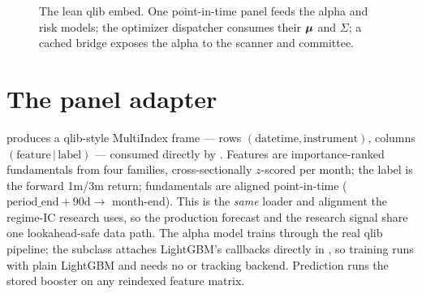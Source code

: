 \documentclass[11pt]{article}
\begin{document}
\begin{figure}[h]
\centering
{}
\caption{The lean qlib embed. One point-in-time panel feeds the alpha and risk
models; the optimizer dispatcher consumes their $\boldsymbol{\mu}$ and $\Sigma$; a cached bridge
exposes the alpha to the scanner and committee.}
\end{figure}

\section{The panel adapter}
 produces a qlib-style MultiIndex frame --- rows
$(\text{datetime},\text{instrument})$, columns
$(\text{feature}\,|\,\text{label})$ --- consumed directly by
. Features are importance-ranked fundamentals from four
families, cross-sectionally $z$-scored per month; the label is the forward 1m/3m
return; fundamentals are aligned point-in-time ($\text{period\_end}+90\text{d}\to$
month-end). This is the \emph{same} loader and alignment the regime-IC research
uses, so the production forecast and the research signal share one lookahead-safe
data path. The alpha model trains through the real qlib  pipeline;
the  subclass attaches LightGBM's callbacks directly in ,
so training runs with plain LightGBM and needs no  or tracking
backend. Prediction runs the stored booster on any reindexed feature matrix.
\end{document}
